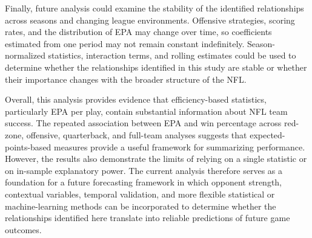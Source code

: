\documentclass[11pt]{article}
\begin{document}
Finally, future analysis could examine the stability of the identified relationships across seasons and changing league environments. Offensive strategies, scoring rates, and the distribution of EPA may change over time, so coefficients estimated from one period may not remain constant indefinitely. Season-normalized statistics, interaction terms, and rolling estimates could be used to determine whether the relationships identified in this study are stable or whether their importance changes with the broader structure of the NFL.

Overall, this analysis provides evidence that efficiency-based statistics, particularly EPA per play, contain substantial information about NFL team success. The repeated association between EPA and win percentage across red-zone, offensive, quarterback, and full-team analyses suggests that expected-points-based measures provide a useful framework for summarizing performance. However, the results also demonstrate the limits of relying on a single statistic or on in-sample explanatory power. The current analysis therefore serves as a foundation for a future forecasting framework in which opponent strength, contextual variables, temporal validation, and more flexible statistical or machine-learning methods can be incorporated to determine whether the relationships identified here translate into reliable predictions of future game outcomes.



\newpage


\end{document}
